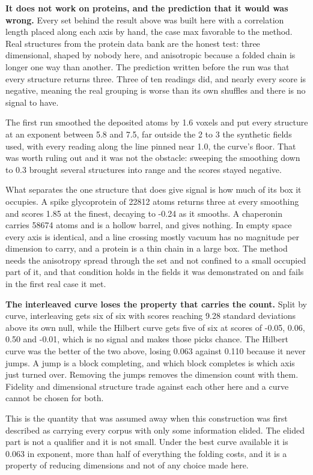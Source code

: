 \textbf{It does not work on proteins, and the prediction that it would was wrong.} Every set behind the result above was built here with a correlation length placed along each axis by hand, the case max favorable to the method. Real structures from the protein data bank are the honest test: three dimensional, shaped by nobody here, and anisotropic because a folded chain is longer one way than another. The prediction written before the run was that every structure returns three. Three of ten readings did, and nearly every score is negative, meaning the real grouping is worse than its own shuffles and there is no signal to have.

The first run smoothed the deposited atoms by 1.6 voxels and put every structure at an exponent between 5.8 and 7.5, far outside the 2 to 3 the synthetic fields used, with every reading along the line pinned near 1.0, the curve's floor. That was worth ruling out and it was not the obstacle: sweeping the smoothing down to 0.3 brought several structures into range and the scores stayed negative.

What separates the one structure that does give signal is how much of its box it occupies. A spike glycoprotein of 22812 atoms returns three at every smoothing and scores 1.85 at the finest, decaying to -0.24 as it smooths. A chaperonin carries 58674 atoms and is a hollow barrel, and gives nothing. In empty space every axis is identical, and a line crossing mostly vacuum has no magnitude per dimension to carry, and a protein is a thin chain in a large box. The method needs the anisotropy spread through the set and not confined to a small occupied part of it, and that condition holds in the fields it was demonstrated on and fails in the first real case it met.

\textbf{The interleaved curve loses the property that carries the count.} Split by curve, interleaving gets six of six with scores reaching 9.28 standard deviations above its own null, while the Hilbert curve gets five of six at scores of -0.05, 0.06, 0.50 and -0.01, which is no signal and makes those picks chance. The Hilbert curve was the better of the two above, losing 0.063 against 0.110 because it never jumps. A jump is a block completing, and which block completes is which axis just turned over. Removing the jumps removes the dimension count with them. Fidelity and dimensional structure trade against each other here and a curve cannot be chosen for both.

This is the quantity that was assumed away when this construction was first described as carrying every corpus with only some information elided. The elided part is not a qualifier and it is not small. Under the best curve available it is 0.063 in exponent, more than half of everything the folding costs, and it is a property of reducing dimensions and not of any choice made here.


